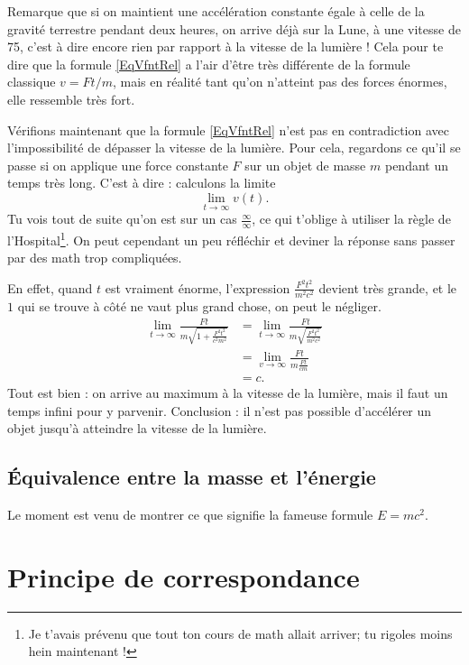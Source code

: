Remarque que si on maintient une accélération constante égale à celle de la gravité terrestre pendant deux heures, on arrive déjà sur la Lune, à une vitesse de \unit{75}{\kilo\meter\per\second}, c'est à dire encore rien par rapport à la vitesse de la lumière ! Cela pour te dire que la formule \eqref{EqVfntRel} a l'air d'être très différente de la formule classique $v=Ft/m$, mais en réalité tant qu'on n'atteint pas des forces énormes, elle ressemble très fort.

Vérifions maintenant que la formule \eqref{EqVfntRel} n'est pas en contradiction avec l'impossibilité de dépasser la vitesse de la lumière. Pour cela, regardons ce qu'il se passe si on applique une force constante $F$ sur un objet de masse $m$ pendant un temps très long. C'est à dire : calculons la limite
\[ 
  \lim_{t\to\infty}v(t).
\]
Tu vois tout de suite qu'on est sur un cas $\frac{ \infty }{ \infty }$, ce qui t'oblige à utiliser la règle de l'Hospital\footnote{Je t'avais prévenu que tout ton cours de math allait arriver; tu rigoles moins hein maintenant !}. On peut cependant un peu réfléchir et deviner la réponse sans passer par des math trop compliquées.

En effet, quand $t$ est vraiment énorme, l'expression $\frac{ F^2t^2 }{ m^2c^2 }$ devient très grande, et le $1$ qui se trouve à côté ne vaut plus grand chose, on peut le négliger.
\begin{equation}
\begin{split}
\lim_{t\to\infty}\frac{ Ft }{ m\sqrt{1+\frac{ F^2t^2 }{ c^2m^2 }} }&=\lim_{t\to\infty}\frac{ Ft }{ m\sqrt{\frac{ F^2t^2 }{ m^2c^2 }} }\\
		&=\lim_{v\to\infty}\frac{ Ft }{ m\frac{ Ft }{ cm } }\\
		&=c.
\end{split}
\end{equation}
Tout est bien : on arrive au maximum à la vitesse de la lumière, mais il faut un temps infini pour y parvenir. Conclusion : il n'est pas possible d'accélérer un objet jusqu'à atteindre la vitesse de la lumière.

\subsection{Équivalence entre la masse et l'énergie}

Le moment est venu de montrer ce que signifie la fameuse formule $E=mc^2$.

\section{Principe de correspondance}

